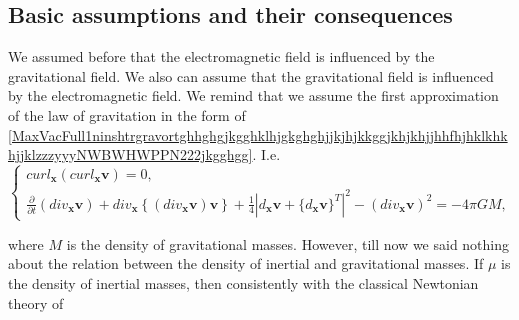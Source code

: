 \documentclass{article}
\theoremstyle{definition}
\theoremstyle{remark}
\renewcommand{\vec}[1]{\mathbf{#1}}
\newcommand{\er}{\eqref}
\newcommand{\er}{\eqref}
\begin{document}
\subsection{Basic assumptions and their consequences}
We assumed before that the electromagnetic field is influenced by
the gravitational field. We also can assume that the gravitational
field is influenced by the electromagnetic field. We remind that we
assume the first approximation of the law of gravitation in the form
of
\er{MaxVacFull1ninshtrgravortghhghgjkgghklhjgkghghjjkjhjkkggjkhjkhjjhhfhjhklkhkhjjklzzzyyyNWBWHWPPN222jkgghgg}.
I.e.
\begin{equation}
\label{MaxVacFull1ninshtrgravortghhghgjkgghklhjgkghghjjkjhjkkggjkhjkhjjhhfhjhklkhkhjjklzzzyyyNWBWHWPPN222jkgghggyuhg}
\begin{cases}
curl_{\vec x}\left(curl_{\vec x}\vec v\right)= 0,\\
\frac{\partial}{\partial t}\left(div_{\vec x}\vec v\right)+div_{\vec
x}\left\{\left(div_{\vec x}\vec v\right)\vec
v\right\}+\frac{1}{4}\left|d_{\vec x}\vec v+\{d_{\vec x}\vec
v\}^T\right|^2-\left(div_{\vec x}\vec v\right)^2= -4\pi GM,
\end{cases}
\end{equation}
%
%
%
\begin{comment}
\begin{equation}
\label{MaxVacFull1ninshtrgravortghhghgjkgghklhjgkghghjjkjhjkkggjkhjkhjjhhfhjhklkhkhjjklzzzyyyNWBWHWPPN222jkgghgghojyuoki}
\begin{cases}
curl_{\vec x}\left(curl_{\vec x}\vec v\right)= 0,\\
\frac{\partial}{\partial t}\left(div_{\vec x}\vec v\right)+\vec
v\cdot\nabla_{\vec x}\left(div_{\vec x}\vec
v\right)+\frac{1}{4}\left|d_{\vec x}\vec v+\{d_{\vec x}\vec
v\}^T\right|^2= -4\pi GM,
\end{cases}
\end{equation}
\end{comment}
%
%
%
where $M$ is the density of gravitational masses. However, till now
we said nothing about the relation between the density of inertial
and gravitational masses. If $\mu$ is the density of inertial
masses, then consistently with the classical Newtonian theory of
\end{document}

